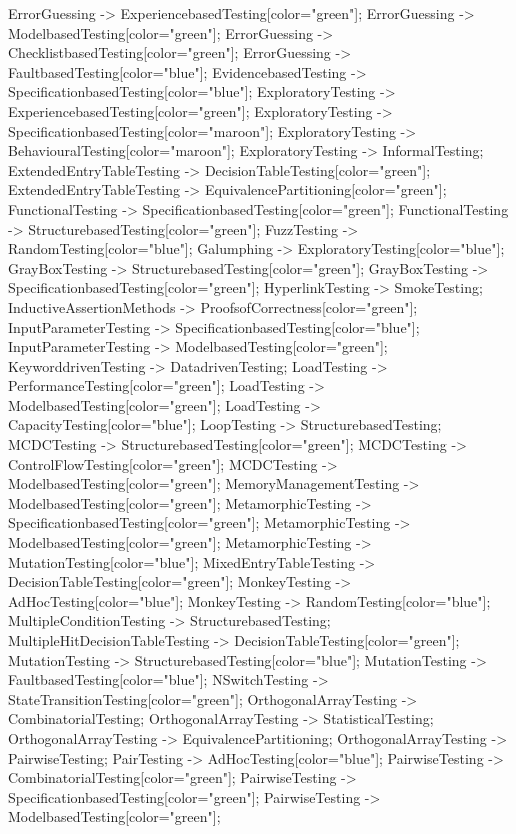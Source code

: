 \documentclass{article}
\begin{document}
{ErrorGuessing -> ExperiencebasedTesting[color="green"];
ErrorGuessing -> ModelbasedTesting[color="green"];
ErrorGuessing -> ChecklistbasedTesting[color="green"];
ErrorGuessing -> FaultbasedTesting[color="blue"];
EvidencebasedTesting -> SpecificationbasedTesting[color="blue"];
ExploratoryTesting -> ExperiencebasedTesting[color="green"];
ExploratoryTesting -> SpecificationbasedTesting[color="maroon"];
ExploratoryTesting -> BehaviouralTesting[color="maroon"];
ExploratoryTesting -> InformalTesting;
ExtendedEntryTableTesting -> DecisionTableTesting[color="green"];
ExtendedEntryTableTesting -> EquivalencePartitioning[color="green"];
FunctionalTesting -> SpecificationbasedTesting[color="green"];
FunctionalTesting -> StructurebasedTesting[color="green"];
FuzzTesting -> RandomTesting[color="blue"];
Galumphing -> ExploratoryTesting[color="blue"];
GrayBoxTesting -> StructurebasedTesting[color="green"];
GrayBoxTesting -> SpecificationbasedTesting[color="green"];
HyperlinkTesting -> SmokeTesting;
InductiveAssertionMethods -> ProofsofCorrectness[color="green"];
InputParameterTesting -> SpecificationbasedTesting[color="blue"];
InputParameterTesting -> ModelbasedTesting[color="green"];
KeyworddrivenTesting -> DatadrivenTesting;
LoadTesting -> PerformanceTesting[color="green"];
LoadTesting -> ModelbasedTesting[color="green"];
LoadTesting -> CapacityTesting[color="blue"];
LoopTesting -> StructurebasedTesting;
MCDCTesting -> StructurebasedTesting[color="green"];
MCDCTesting -> ControlFlowTesting[color="green"];
MCDCTesting -> ModelbasedTesting[color="green"];
MemoryManagementTesting -> ModelbasedTesting[color="green"];
MetamorphicTesting -> SpecificationbasedTesting[color="green"];
MetamorphicTesting -> ModelbasedTesting[color="green"];
MetamorphicTesting -> MutationTesting[color="blue"];
MixedEntryTableTesting -> DecisionTableTesting[color="green"];
MonkeyTesting -> AdHocTesting[color="blue"];
MonkeyTesting -> RandomTesting[color="blue"];
MultipleConditionTesting -> StructurebasedTesting;
MultipleHitDecisionTableTesting -> DecisionTableTesting[color="green"];
MutationTesting -> StructurebasedTesting[color="blue"];
MutationTesting -> FaultbasedTesting[color="blue"];
NSwitchTesting -> StateTransitionTesting[color="green"];
OrthogonalArrayTesting -> CombinatorialTesting;
OrthogonalArrayTesting -> StatisticalTesting;
OrthogonalArrayTesting -> EquivalencePartitioning;
OrthogonalArrayTesting -> PairwiseTesting;
PairTesting -> AdHocTesting[color="blue"];
PairwiseTesting -> CombinatorialTesting[color="green"];
PairwiseTesting -> SpecificationbasedTesting[color="green"];
PairwiseTesting -> ModelbasedTesting[color="green"];
}
\end{document}
